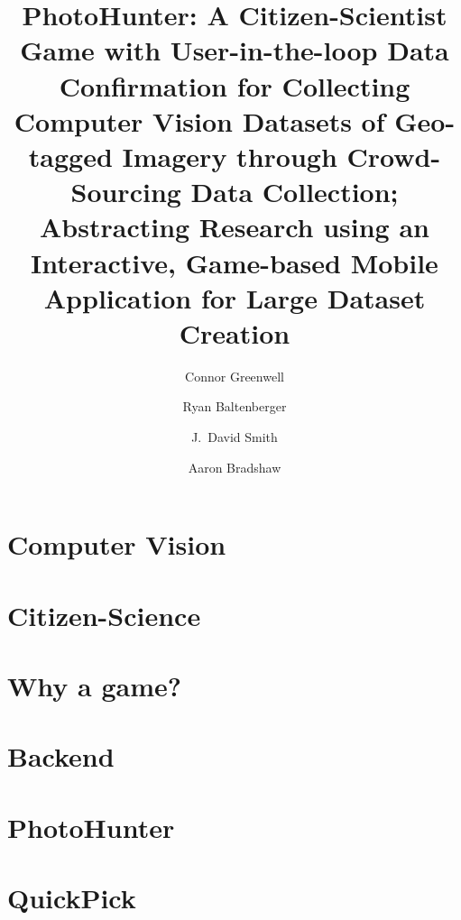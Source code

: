 \documentclass[aspectratio=169]{beamer}
\title[PhotoHunter]{PhotoHunter: A Citizen-Scientist Game with User-in-the-loop 
  Data Confirmation for Collecting Computer Vision Datasets of 
  Geo-tagged Imagery through Crowd-Sourcing Data Collection; 
  Abstracting Research using an Interactive, Game-based Mobile 
  Application for Large Dataset Creation}
\author[]{Connor Greenwell \and Ryan Baltenberger 
 \and J.\ David Smith \and Aaron Bradshaw}
\begin{document}
\maketitle

\section{Computer Vision}

\section{Citizen-Science}

\section{Why a game?}

\section{Backend}

\section{PhotoHunter}

\section{QuickPick}
\end{document}
